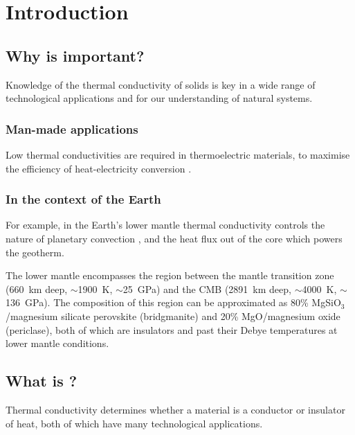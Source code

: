 
\chapter{Introduction} %

\label{Chapter1} %


\section{Why is \tcs important?}
Knowledge of the thermal conductivity of solids is key in a wide range of technological applications and for our understanding of natural systems.

\subsection{Man-made applications}
Low thermal conductivities are required in thermoelectric materials, to maximise the efficiency of heat-electricity conversion \citep{Snyder2008}.

\subsection{In the context of the Earth}
For example, in the Earth's lower mantle thermal conductivity controls the nature of planetary convection \citep{Tosi2013}, and the heat flux out of the core which powers the geotherm. 

The lower mantle encompasses the region between the mantle transition zone (660~km deep, $\sim$1900~K, $\sim$25~GPa) and the CMB (2891~km deep, $\sim$4000~K, $\sim$136~GPa). The composition of this region can be approximated as 80\% MgSiO$_3$/magnesium silicate perovskite (bridgmanite) and 20\% MgO/magnesium oxide (periclase), both of which are insulators and past their Debye temperatures at lower mantle conditions.

\section{What is \tc?}
Thermal conductivity determines whether a material is a conductor or insulator of heat, both of which have many technological applications.

